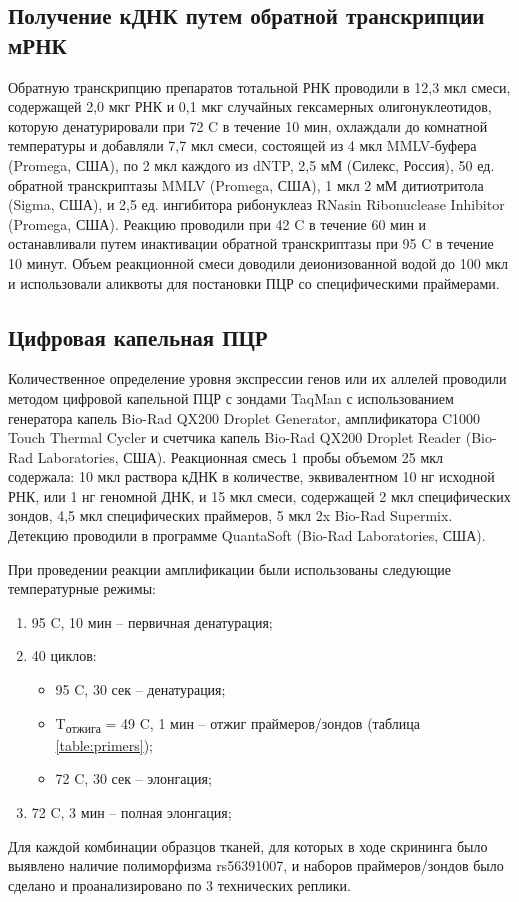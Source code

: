 \subsection{Получение кДНК путем обратной транскрипции мРНК}

Обратную транскрипцию препаратов тотальной РНК проводили в 12,3 мкл смеси, содержащей 2,0 мкг РНК и 0,1 мкг случайных гексамерных олигонуклеотидов, которую денатурировали при 72 \textdegree{}C в течение 10 мин, охлаждали до комнатной температуры и добавляли 7,7 мкл смеси, состоящей из 4 мкл MMLV-буфера (Promega, США), по 2 мкл каждого из dNTP, 2,5 мМ (Силекс, Россия), 50 ед. обратной транскриптазы MMLV (Promega, США), 1 мкл 2 мМ дитиотритола (Sigma, США), и 2,5 ед. ингибитора рибонуклеаз RNasin Ribonuclease Inhibitor (Promega, США). Реакцию проводили при 42 \textdegree{}C в течение 60 мин и останавливали путем инактивации обратной транскриптазы при 95 \textdegree{}C в течение 10 минут. Объем реакционной смеси доводили деионизованной водой до 100 мкл и использовали аликвоты для постановки ПЦР со специфическими праймерами.

\subsection{Цифровая капельная ПЦР}

Количественное определение уровня экспрессии генов или их аллелей проводили методом цифровой капельной ПЦР с зондами TaqMan с использованием генератора капель Bio-Rad QX200 Droplet Generator, амплификатора C1000 Touch Thermal Cycler и счетчика капель Bio-Rad QX200 Droplet Reader (Bio-Rad Laboratories, США). Реакционная смесь 1 пробы объемом 25 мкл содержала: 10 мкл раствора кДНК в количестве, эквивалентном 10 нг исходной РНК, или 1 нг геномной ДНК, и 15 мкл смеси, содержащей 2 мкл специфических зондов, 4,5 мкл специфических праймеров, 5 мкл 2x Bio-Rad Supermix. Детекцию проводили в программе QuantaSoft (Bio-Rad Laboratories, США).

При проведении реакции амплификации были использованы следующие температурные режимы:

\begin{enumerate}
	\item 95 \textdegree{}C, 10 мин -- первичная денатурация;
	\item 40 циклов:
	\begin{itemize}
		\item 95 \textdegree{}C, 30 сек -- денатурация;
		\item T\textsubscript{отжига} = 49 \textdegree{}C, 1 мин -- отжиг праймеров/зондов (таблица \ref{table:primers});
		\item 72 \textdegree{}C, 30 сек -- элонгация;
	\end{itemize} 
	\item 72 \textdegree{}C, 3 мин -- полная элонгация;
\end{enumerate}

Для каждой комбинации образцов тканей, для которых в ходе скрининга было выявлено наличие полиморфизма rs56391007, и наборов праймеров/зондов было сделано и проанализировано по 3 технических реплики.

